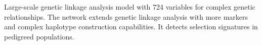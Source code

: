 Large-scale genetic linkage analysis model with 724 variables for complex genetic relationships. The network extends genetic linkage analysis with more markers and complex haplotype construction capabilities. It detects selection signatures in pedigreed populations.
